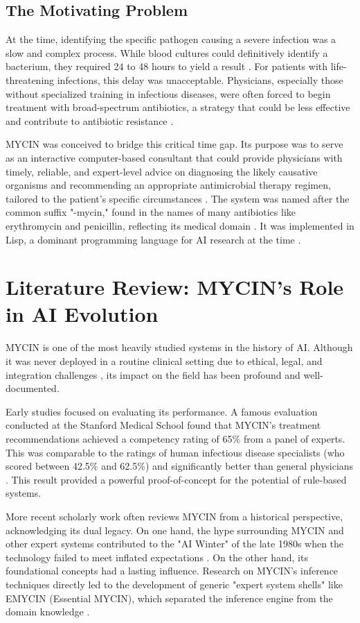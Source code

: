 \documentclass[conference]{IEEEtran}
\begin{document}
\subsection{The Motivating Problem}
At the time, identifying the specific pathogen causing a severe infection was a slow and complex process. While blood cultures could definitively identify a bacterium, they required 24 to 48 hours to yield a result \cite{b11}. For patients with life-threatening infections, this delay was unacceptable. Physicians, especially those without specialized training in infectious diseases, were often forced to begin treatment with broad-spectrum antibiotics, a strategy that could be less effective and contribute to antibiotic resistance \cite{b12}.

MYCIN was conceived to bridge this critical time gap. Its purpose was to serve as an interactive computer-based consultant that could provide physicians with timely, reliable, and expert-level advice on diagnosing the likely causative organisms and recommending an appropriate antimicrobial therapy regimen, tailored to the patient's specific circumstances \cite{b7}. The system was named after the common suffix "-mycin," found in the names of many antibiotics like erythromycin and penicillin, reflecting its medical domain \cite{b6}. It was implemented in Lisp, a dominant programming language for AI research at the time \cite{b13}.

\section{Literature Review: MYCIN's Role in AI Evolution}
MYCIN is one of the most heavily studied systems in the history of AI. Although it was never deployed in a routine clinical setting due to ethical, legal, and integration challenges \cite{b14, b15}, its impact on the field has been profound and well-documented.

Early studies focused on evaluating its performance. A famous evaluation conducted at the Stanford Medical School found that MYCIN's treatment recommendations achieved a competency rating of 65\% from a panel of experts. This was comparable to the ratings of human infectious disease specialists (who scored between 42.5\% and 62.5\%) and significantly better than general physicians \cite{b16}. This result provided a powerful proof-of-concept for the potential of rule-based systems.

More recent scholarly work often reviews MYCIN from a historical perspective, acknowledging its dual legacy. On one hand, the hype surrounding MYCIN and other expert systems contributed to the "AI Winter" of the late 1980s when the technology failed to meet inflated expectations \cite{b17}. On the other hand, its foundational concepts had a lasting influence. Research on MYCIN's inference techniques directly led to the development of generic "expert system shells" like EMYCIN (Essential MYCIN), which separated the inference engine from the domain knowledge \cite{b18}.
\end{document}
